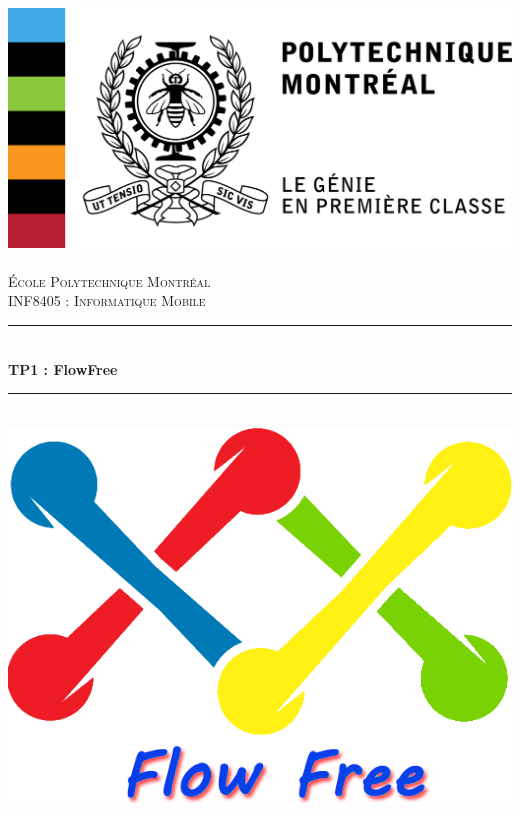 \documentclass[12pt, a4paper]{article}%
\newcommand{\HRule}{\rule{\linewidth}{0.5mm}}
\begin{document}
\begin{titlepage}
  \begin{sffamily}
  \begin{center}

    \includegraphics[scale=1]{Images/polytechnique_genie_gauche_fr_rgb.png}~\\[1.5cm]

    \textsc{\LARGE École Polytechnique Montréal}\\[2cm]

    \textsc{\Large INF8405 : Informatique Mobile}\\[1.5cm]

    \HRule \\[0.4cm]
    { \huge \bfseries TP1 : FlowFree\\[0.4cm] }

    \HRule \\[2cm]
    \includegraphics[scale=1]{Images/logoFF.png}\\[2cm]


\end{center}
\end{sffamily}
\end{titlepage}
\end{document}

